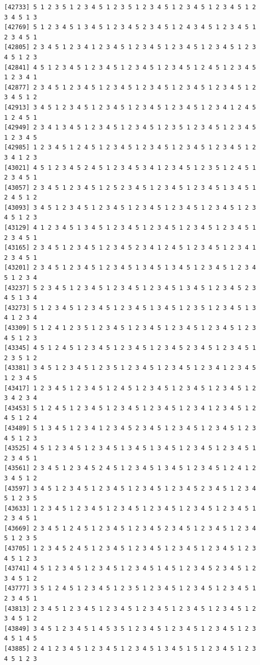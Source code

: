 \documentclass[
  english,
]{book}
\begin{document}
\begin{verbatim}
[42733] 5 1 2 3 5 1 2 3 4 5 1 2 3 5 1 2 3 4 5 1 2 3 4 5 1 2 3 4 5 1 2 3 4 5 1 3
[42769] 5 1 2 3 4 5 1 3 4 5 1 2 3 4 5 2 3 4 5 1 2 4 3 4 5 1 2 3 4 5 1 2 3 4 5 1
[42805] 2 3 4 5 1 2 3 4 1 2 3 4 5 1 2 3 4 5 1 2 3 4 5 1 2 3 4 5 1 2 3 4 5 1 2 3
[42841] 4 5 1 2 3 4 5 1 2 3 4 5 1 2 3 4 5 1 2 3 4 5 1 2 4 5 1 2 3 4 5 1 2 3 4 1
[42877] 2 3 4 5 1 2 3 4 5 1 2 3 4 5 1 2 3 4 5 1 2 3 4 5 1 2 3 4 5 1 2 3 4 5 1 2
[42913] 3 4 5 1 2 3 4 5 1 2 3 4 5 1 2 3 4 5 1 2 3 4 5 1 2 3 4 1 2 4 5 1 2 4 5 1
[42949] 2 3 4 1 3 4 5 1 2 3 4 5 1 2 3 4 5 1 2 3 5 1 2 3 4 5 1 2 3 4 5 1 2 3 4 5
[42985] 1 2 3 4 5 1 2 4 5 1 2 3 4 5 1 2 3 4 5 1 2 3 4 5 1 2 3 4 5 1 2 3 4 1 2 3
[43021] 4 5 1 2 3 4 5 2 4 5 1 2 3 4 5 3 4 1 2 3 4 5 1 2 3 5 1 2 4 5 1 2 3 4 5 1
[43057] 2 3 4 5 1 2 3 4 5 1 2 5 2 3 4 5 1 2 3 4 5 1 2 3 4 5 1 3 4 5 1 2 4 5 1 2
[43093] 3 4 5 1 2 3 4 5 1 2 3 4 5 1 2 3 4 5 1 2 3 4 5 1 2 3 4 5 1 2 3 4 5 1 2 3
[43129] 4 1 2 3 4 5 1 3 4 5 1 2 3 4 5 1 2 3 4 5 1 2 3 4 5 1 2 3 4 5 1 2 3 4 5 1
[43165] 2 3 4 5 1 2 3 4 5 1 2 3 4 5 2 3 4 1 2 4 5 1 2 3 4 5 1 2 3 4 1 2 3 4 5 1
[43201] 2 3 4 5 1 2 3 4 5 1 2 3 4 5 1 3 4 5 1 3 4 5 1 2 3 4 5 1 2 3 4 5 1 2 3 4
[43237] 5 2 3 4 5 1 2 3 4 5 1 2 3 4 5 1 2 3 4 5 1 3 4 5 1 2 3 4 5 2 3 4 5 1 3 4
[43273] 5 1 2 3 4 5 1 2 3 4 5 1 2 3 4 5 1 3 4 5 1 2 3 5 1 2 3 4 5 1 3 4 1 2 3 4
[43309] 5 1 2 4 1 2 3 5 1 2 3 4 5 1 2 3 4 5 1 2 3 4 5 1 2 3 4 5 1 2 3 4 5 1 2 3
[43345] 4 5 1 2 4 5 1 2 3 4 5 1 2 3 4 5 1 2 3 4 5 2 3 4 5 1 2 3 4 5 1 2 3 5 1 2
[43381] 3 4 5 1 2 3 4 5 1 2 3 5 1 2 3 4 5 1 2 3 4 5 1 2 3 4 1 2 3 4 5 1 2 3 4 5
[43417] 1 2 3 4 5 1 2 3 4 5 1 2 4 5 1 2 3 4 5 1 2 3 4 5 1 2 3 4 5 1 2 3 4 2 3 4
[43453] 5 1 2 4 5 1 2 3 4 5 1 2 3 4 5 1 2 3 4 5 1 2 3 4 1 2 3 4 5 1 2 4 5 1 2 4
[43489] 5 1 3 4 5 1 2 3 4 1 2 3 4 5 2 3 4 5 1 2 3 4 5 1 2 3 4 5 1 2 3 4 5 1 2 3
[43525] 4 5 1 2 3 4 5 1 2 3 4 5 1 3 4 5 1 3 4 5 1 2 3 4 5 1 2 3 4 5 1 2 3 4 5 1
[43561] 2 3 4 5 1 2 3 4 5 2 4 5 1 2 3 4 5 1 3 4 5 1 2 3 4 5 1 2 4 1 2 3 4 5 1 2
[43597] 3 4 5 1 2 3 4 5 1 2 3 4 5 1 2 3 4 5 1 2 3 4 5 2 3 4 5 1 2 3 4 5 1 2 3 5
[43633] 1 2 3 4 5 1 2 3 4 5 1 2 3 4 5 1 2 3 4 5 1 2 3 4 5 1 2 3 4 5 1 2 3 4 5 1
[43669] 2 3 4 5 1 2 4 5 1 2 3 4 5 1 2 3 4 5 2 3 4 5 1 2 3 4 5 1 2 3 4 5 1 2 3 5
[43705] 1 2 3 4 5 2 4 5 1 2 3 4 5 1 2 3 4 5 1 2 3 4 5 1 2 3 4 5 1 2 3 4 5 1 2 3
[43741] 4 5 1 2 3 4 5 1 2 3 4 5 1 2 3 4 5 1 4 5 1 2 3 4 5 2 3 4 5 1 2 3 4 5 1 2
[43777] 3 5 1 2 4 5 1 2 3 4 5 1 2 3 5 1 2 3 4 5 1 2 3 4 5 1 2 3 4 5 1 2 3 4 5 1
[43813] 2 3 4 5 1 2 3 4 5 1 2 3 4 5 1 2 3 4 5 1 2 3 4 5 1 2 3 4 5 1 2 3 4 5 1 2
[43849] 3 4 5 1 2 3 4 5 1 4 5 3 5 1 2 3 4 5 1 2 3 4 5 1 2 3 4 5 1 2 3 4 5 1 4 5
[43885] 2 4 1 2 3 4 5 1 2 3 4 5 1 2 3 4 5 1 3 4 5 1 5 1 2 3 4 5 1 2 3 4 5 1 2 3

\end{verbatim}
\end{document}
